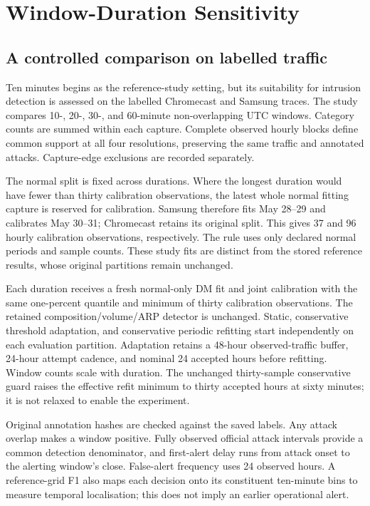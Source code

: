 \section{Window-Duration Sensitivity}
\label{sec:window-size-study}

\subsection{A controlled comparison on labelled traffic}

Ten minutes begins as the reference-study setting, but its suitability for
intrusion detection is assessed on the labelled Chromecast and Samsung traces.
The study compares 10-, 20-, 30-, and 60-minute non-overlapping UTC windows.
Category counts are summed within each capture. Complete observed hourly blocks
define common support at all four resolutions, preserving the same traffic and
annotated attacks. Capture-edge exclusions are recorded separately.

The normal split is fixed across durations. Where the longest duration would
have fewer than thirty calibration observations, the latest whole normal
fitting capture is reserved for calibration. Samsung therefore fits May 28--29
and calibrates May 30--31; Chromecast retains its original split. This gives
37 and 96 hourly calibration observations, respectively. The rule uses only
declared normal periods and sample counts. These study fits are distinct from
the stored reference results, whose original partitions remain unchanged.

Each duration receives a fresh normal-only DM fit and joint calibration with
the same one-percent quantile and minimum of thirty calibration observations.
The retained composition/volume/ARP detector is unchanged. Static, conservative
threshold adaptation, and conservative periodic refitting start independently
on each evaluation partition. Adaptation retains a 48-hour observed-traffic
buffer, 24-hour attempt cadence, and nominal 24 accepted hours before refitting.
Window counts scale with duration. The unchanged thirty-sample conservative
guard raises the effective refit minimum to thirty accepted hours at sixty
minutes; it is not relaxed to enable the experiment.

Original annotation hashes are checked against the saved labels. Any attack
overlap makes a window positive. Fully observed official attack intervals
provide a common detection denominator, and first-alert delay runs from attack
onset to the alerting window's close. False-alert frequency uses 24 observed
hours. A reference-grid F1 also maps each decision onto its constituent
ten-minute bins to measure temporal localisation; this does not imply an
earlier operational alert.

